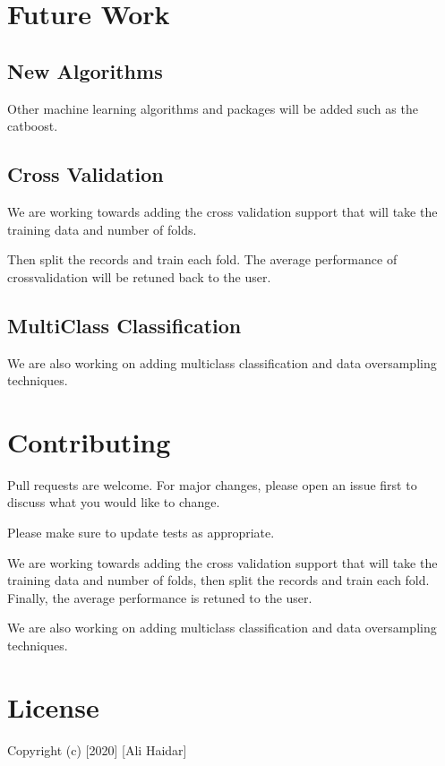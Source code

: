 \documentclass[letterpaper,10pt,english]{sphinxmanual}
\begin{document}
\chapter{Future Work}
\label{\detokenize{index:future-work}}

\section{New Algorithms}
\label{\detokenize{index:new-algorithms}}
Other machine learning algorithms and packages will be added such as the catboost.


\section{Cross Validation}
\label{\detokenize{index:cross-validation}}
We are working towards adding the cross validation support that will take the training data and number of folds.

Then split the records and train each fold. The average performance of cross\sphinxhyphen{}validation will be retuned back to the user.


\section{Multi\sphinxhyphen{}Class Classification}
\label{\detokenize{index:multi-class-classification}}
We are also working on adding multi\sphinxhyphen{}class classification and data oversampling techniques.


\chapter{Contributing}
\label{\detokenize{index:contributing}}
Pull requests are welcome. For major changes, please open an issue first
to discuss what you would like to change.

Please make sure to update tests as appropriate.

We are working towards adding the cross validation support that will take the training data and number of folds, then split the records and train each fold. Finally, the average performance is retuned to the user.

We are also working on adding multi\sphinxhyphen{}class classification and data oversampling techniques.


\chapter{License}
\label{\detokenize{index:license}}
Copyright (c) {[}2020{]} {[}Ali Haidar{]}
\end{document}
